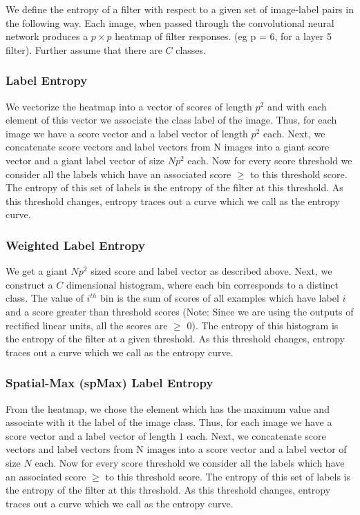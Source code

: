 \documentclass[runningheads]{llncs}
\begin{document}
We define the entropy of a filter with respect to a given set of image-label pairs in the following way. Each image, when passed through the convolutional neural network produces a $p \times p$ heatmap of filter responses. (eg p = 6, for a layer 5 filter). Further assume that there are $C$ classes.
\subsubsection{Label Entropy}
\label{sub:def-label-ent}
We vectorize the heatmap into a vector of scores of length $p^2$ and with each element of this vector we associate the class label of the image. Thus, for each image we have a score vector and a label vector of length $p^2$ each. Next, we concatenate score vectors and label vectors from N images into a giant score vector and a giant label vector  of size $Np^2$ each. Now for every score threshold we consider all the labels which have an associated score $\geq$ to this threshold score. The entropy of this set of labels is the entropy of the filter at this threshold. As this threshold changes, entropy traces out a curve which we call as the entropy curve.  

\subsubsection{Weighted Label Entropy}
\label{sub:def-weighted-label-ent}
We get a giant $Np^2$  sized score and label vector as described above. Next, we construct a $C$ dimensional histogram, where each bin corresponds to a distinct class. The value of $i^{th}$ bin is the sum of scores of all examples which have label $i$ and a score greater than threshold scores (Note: Since we are using the outputs of rectified linear units, all the scores are $\geq$ 0). The entropy of this histogram is the entropy of the filter at a given threshold. As this threshold changes, entropy traces out a curve which we call as the entropy curve.  

\subsubsection{Spatial-Max (spMax) Label Entropy}
\label{sub:def-spmax-label-ent}
From the heatmap, we chose the element which has the maximum value and associate with it the label of the image class. Thus, for each image we have a score vector and a label vector of length $1$ each. Next, we concatenate score vectors and label vectors from N images into a  score vector and a  label vector  of size $N$ each. Now for every score threshold we consider all the labels which have an associated score $\geq$ to this threshold score. The entropy of this set of labels is the entropy of the filter at this threshold. As this threshold changes, entropy traces out a curve which we call as the entropy curve.
\end{document}
